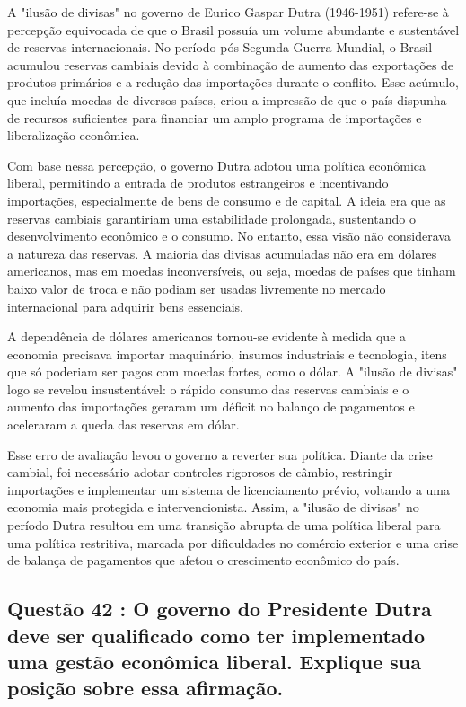 \documentclass[a4paper,12pt]{article}[abntex2]
\begin{document}
A "ilusão de divisas" no governo de Eurico Gaspar Dutra (1946-1951) refere-se à percepção equivocada de que o Brasil possuía um volume abundante e sustentável de reservas internacionais. No período pós-Segunda Guerra Mundial, o Brasil acumulou reservas cambiais devido à combinação de aumento das exportações de produtos primários e a redução das importações durante o conflito. Esse acúmulo, que incluía moedas de diversos países, criou a impressão de que o país dispunha de recursos suficientes para financiar um amplo programa de importações e liberalização econômica.

Com base nessa percepção, o governo Dutra adotou uma política econômica liberal, permitindo a entrada de produtos estrangeiros e incentivando importações, especialmente de bens de consumo e de capital. A ideia era que as reservas cambiais garantiriam uma estabilidade prolongada, sustentando o desenvolvimento econômico e o consumo. No entanto, essa visão não considerava a natureza das reservas. A maioria das divisas acumuladas não era em dólares americanos, mas em moedas inconversíveis, ou seja, moedas de países que tinham baixo valor de troca e não podiam ser usadas livremente no mercado internacional para adquirir bens essenciais.

A dependência de dólares americanos tornou-se evidente à medida que a economia precisava importar maquinário, insumos industriais e tecnologia, itens que só poderiam ser pagos com moedas fortes, como o dólar. A "ilusão de divisas" logo se revelou insustentável: o rápido consumo das reservas cambiais e o aumento das importações geraram um déficit no balanço de pagamentos e aceleraram a queda das reservas em dólar.

Esse erro de avaliação levou o governo a reverter sua política. Diante da crise cambial, foi necessário adotar controles rigorosos de câmbio, restringir importações e implementar um sistema de licenciamento prévio, voltando a uma economia mais protegida e intervencionista. Assim, a "ilusão de divisas" no período Dutra resultou em uma transição abrupta de uma política liberal para uma política restritiva, marcada por dificuldades no comércio exterior e uma crise de balança de pagamentos que afetou o crescimento econômico do país.

\subsection{\textbf{Questão 42 : O governo do Presidente Dutra deve ser qualificado como ter implementado uma gestão econômica liberal. Explique sua posição sobre essa afirmação.}}
\end{document}
